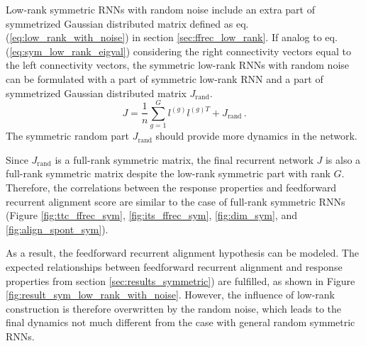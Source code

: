 \documentclass[11pt]{article}
\begin{document}
		Low-rank symmetric RNNs with random noise include an extra part of symmetrized Gaussian distributed matrix defined as  eq.(\ref{eq:low_rank_with_noise}) in section \ref{sec:ffrec_low_rank}. If analog to eq.(\ref{eq:sym_low_rank_eigval}) considering the right connectivity vectors equal to the left connectivity vectors, the symmetric low-rank RNNs with random noise can be formulated with a part of symmetric low-rank RNN and a part of symmetrized Gaussian distributed matrix $J_{\text{rand}}$. 
		\begin{equation} \label{eq:low_rank_sym_with_noise}
			J = \frac{1}{n}\sum_{g =1}^{G} l^{(g)} l^{(g)T} + J_{\text{rand}} \, .
		\end{equation}
		The symmetric random part $J_{\text{rand}}$ should provide more dynamics in the network. 
		
		Since $J_{\text{rand}}$ is a full-rank symmetric matrix, the final recurrent network $J$ is also a full-rank symmetric matrix despite the low-rank symmetric part with rank $G$. Therefore, the correlations between the response properties and feedforward recurrent alignment score are similar to the case of full-rank symmetric RNNs (Figure \ref{fig:ttc_ffrec_sym}, \ref{fig:its_ffrec_sym}, \ref{fig:dim_sym}, and \ref{fig:align_spont_sym}). 
		
		As a result, the feedforward recurrent alignment hypothesis can be modeled. The expected relationships between feedforward recurrent alignment and response properties from section \ref{sec:results_symmetric}) are fulfilled, as shown in Figure \ref{fig:result_sym_low_rank_with_noise}. However, the influence of low-rank construction is therefore overwritten by the random noise, which leads to the final dynamics not much different from the case with general random symmetric RNNs. 
		
\end{document}
